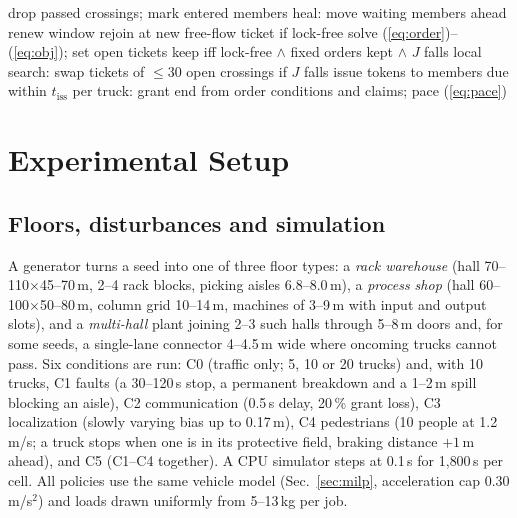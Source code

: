 \documentclass[conference]{IEEEtran}
\begin{document}
\begin{algorithm}[t]
\caption{Traffic manager period (every 1\,s)}
\label{alg:step}
\begin{algorithmic}[1]
\State drop passed crossings; mark entered members
 \State heal: move waiting members ahead \EndIf
{}
   \State renew window
  \Else \State rejoin at new free-flow ticket if lock-free \EndIf
\EndFor
{}
  \State solve (\ref{eq:order})--(\ref{eq:obj}); set open tickets
  \State keep iff lock-free $\wedge$ fixed orders kept $\wedge$ $J$ falls
\EndIf
\State local search: swap tickets of $\le30$ open crossings if $J$ falls
\State issue tokens to members due within $t_{\mathrm{iss}}$
\State per truck: grant end from order conditions and claims; pace (\ref{eq:pace})
\end{algorithmic}
\end{algorithm}

\section{Experimental Setup}
\label{sec:setup}

\subsection{Floors, disturbances and simulation}
A generator turns a seed into one of three floor types: a \emph{rack
warehouse} (hall 70--110$\times$45--70\,m, 2--4 rack blocks, picking aisles
6.8--8.0\,m), a \emph{process shop} (hall 60--100$\times$50--80\,m, column
grid 10--14\,m, machines of 3--9\,m with input and output slots), and a
\emph{multi-hall} plant joining 2--3 such halls through 5--8\,m doors and,
for some seeds, a single-lane connector 4--4.5\,m wide where oncoming trucks
cannot pass. Six conditions are run: C0 (traffic only; 5, 10 or 20 trucks)
and, with 10 trucks, C1 faults (a 30--120\,s stop, a permanent breakdown and
a 1--2\,m spill blocking an aisle), C2 communication (0.5\,s delay, 20\,\%
grant loss), C3 localization (slowly varying bias up to 0.17\,m), C4
pedestrians (10 people at 1.2\,m/s; a truck stops when one is in its
protective field, braking distance $+1$\,m ahead), and C5 (C1--C4 together).
A CPU simulator steps at 0.1\,s for 1{,}800\,s per cell. All policies use the
same vehicle model (Sec.~\ref{sec:milp}, acceleration cap 0.30\,m/s$^2$) and
loads drawn uniformly from 5--13\,kg per job.
\end{document}
